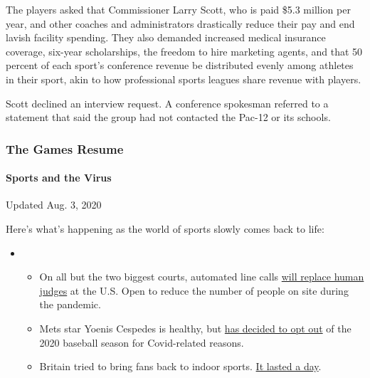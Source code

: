 The players asked that Commissioner Larry Scott, who is paid \$5.3
million per year, and other coaches and administrators drastically
reduce their pay and end lavish facility spending. They also demanded
increased medical insurance coverage, six-year scholarships, the freedom
to hire marketing agents, and that 50 percent of each sport's conference
revenue be distributed evenly among athletes in their sport, akin to how
professional sports leagues share revenue with players.

Scott declined an interview request. A conference spokesman referred to
a statement that said the group had not contacted the Pac-12 or its
schools.

\hypertarget{the-games-resume}{%
\subsubsection{The Games Resume}\label{the-games-resume}}

\hypertarget{sports-and-the-virus}{%
\paragraph{Sports and the Virus}\label{sports-and-the-virus}}

Updated Aug. 3, 2020

Here's what's happening as the world of sports slowly comes back to
life:

\begin{itemize}
\item
  \begin{itemize}
  \tightlist
  \item
    On all but the two biggest courts, automated line calls
    \href{https://www.nytimes3xbfgragh.onion/2020/08/03/sports/tennis/us-open-hawkeye-line-judges.html?action=click\&pgtype=Article\&state=default\&region=MAIN_CONTENT_2\&context=storylines_keepup}{will
    replace human judges} at the U.S. Open to reduce the number of
    people on site during the pandemic.
  \item
    Mets star Yoenis Cespedes is healthy, but
    \href{https://www.nytimes3xbfgragh.onion/2020/08/02/sports/baseball/Yoenis-cespedes-opt-out-rule.html?action=click\&pgtype=Article\&state=default\&region=MAIN_CONTENT_2\&context=storylines_keepup}{has
    decided to opt out} of the 2020 baseball season for Covid-related
    reasons.
  \item
    Britain tried to bring fans back to indoor sports.
    \href{https://www.nytimes3xbfgragh.onion/2020/08/02/sports/snooker-world-championship.html?action=click\&pgtype=Article\&state=default\&region=MAIN_CONTENT_2\&context=storylines_keepup}{It
    lasted a day}.
  \end{itemize}
\end{itemize}

